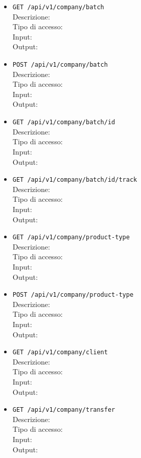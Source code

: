 \documentclass[a4paper,11pt]{article}
\begin{document}
\begin{itemize}
  \item \texttt{GET /api/v1/company/batch}
    \\ Descrizione:
    \\ Tipo di accesso:
    \\ Input:
    \\ Output:

  \item \texttt{POST /api/v1/company/batch}
    \\ Descrizione:
    \\ Tipo di accesso:
    \\ Input:
    \\ Output:

  \item \texttt{GET /api/v1/company/batch/{{id}}}
    \\ Descrizione:
    \\ Tipo di accesso:
    \\ Input:
    \\ Output:

  \item \texttt{GET /api/v1/company/batch/{{id}}/track}
    \\ Descrizione:
    \\ Tipo di accesso:
    \\ Input:
    \\ Output:

  \item \texttt{GET /api/v1/company/product-type}
    \\ Descrizione:
    \\ Tipo di accesso:
    \\ Input:
    \\ Output:

  \item \texttt{POST /api/v1/company/product-type}
    \\ Descrizione:
    \\ Tipo di accesso:
    \\ Input:
    \\ Output:

  \item \texttt{GET /api/v1/company/client}
    \\ Descrizione:
    \\ Tipo di accesso:
    \\ Input:
    \\ Output:

  \item \texttt{GET /api/v1/company/transfer}
    \\ Descrizione:
    \\ Tipo di accesso:
    \\ Input:
    \\ Output:


\end{itemize}
\end{document}
